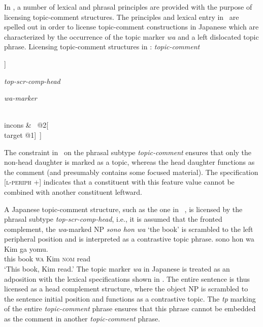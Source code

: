 \documentclass[output=paper
                ,modfonts
                ,nonflat
	        ,collection
	        ,collectionchapter
	        ,collectiontoclongg
 	        ,biblatex
                ,babelshorthands
                ,newtxmath
                ,draftmode
                ,colorlinks, citecolor=brown
]{./langsci/langscibook}
\begin{document}
In \cite{song2018}, a number of lexical and phrasal principles are
provided with the purpose of licensing topic-comment structures. The
principles and lexical entry in~ are spelled out
in order to license topic-comment constructions in Japanese which are
characterized by the occurrence of the topic marker \emph{wa} and a
left dislocated topic phrase.
\ea
\label{ex:song-topic}
Licensing topic-comment structures in \cite{song2018}:
\ea
\label{ex:song-topic-a}
\textit{topic-comment}
\impl
\begin{avm}
  [l-periph & $+$\\
  mkg & tp\\
  hd|mkg|tp & $-$\\
  nhd & [mkg & tp\\l-periph & $+$]]
  \end{avm}
  \ex
  \label{ex:song-topic-b}
  \textit{top-scr-comp-head}
\impl
  \begin{avm}
  \end{avm}
  \ex
  \label{ex:song-topic-c}
  \textit{wa-marker}
\impl
  \begin{avm}
    [stem & \<\normalfont{\textit{wa}}\>\\
    incons-key & @2\\
    mkg & tp\\
    comps & \<[index @1]\>\\
    incons & \<\normalfont{!}\ @2[\\target @1]\ \normalfont{!}\>]
  \end{avm}
\z
\z
The constraint in~ on the phrasal subtype
\textit{topic-comment} ensures that only the non-head daughter is
marked as a topic, whereas the head daughter functions as the comment
(and presumably contains some focused material). The specification
[\textsc{l-periph} +] indicates that a constituent with this feature
value cannot be combined with another constituent leftward.

A Japanese topic-comment structure, such as the one
in~ \citep[198]{song2018}, is licensed by the phrasal
subtype \textit{top-scr-comp-head}, i.e., it is assumed that the
fronted complement, the \emph{wa}-marked NP \textit{sono hon wa} `the book'
is scrambled to the left peripheral position and is interpreted as a
contrastive topic phrase.
\ea
\label{ex:song-wa}
\gll sono hon wa Kim ga yomu.\\
this book \textsc{wa} Kim \textsc{nom} read \\
\trans `This book, Kim read.'
\z
The topic marker \emph{wa} in Japanese is treated as an adposition with the
lexical specifications shown in . The entire
sentence is thus licensed as a head complement structure, where the
object NP is scrambled to the sentence initial position and functions
as a contrastive topic. The \textit{tp} marking of the entire
\textit{topic-comment} phrase ensures that this phrase cannot be
embedded as the comment in another \textit{topic-comment} phrase.
\end{document}

